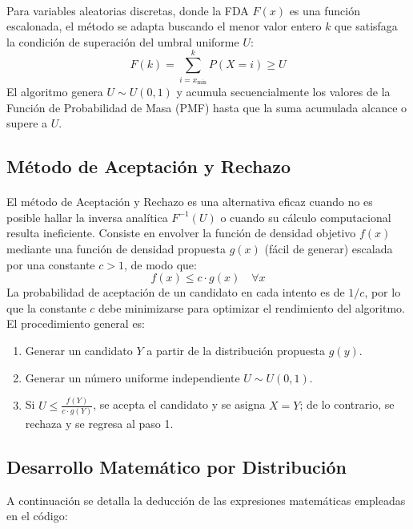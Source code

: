 \documentclass{article}
\begin{document}
\paragraph{}
Para variables aleatorias discretas, donde la FDA $F(x)$ es una función escalonada, el método se adapta buscando el menor valor entero $k$ que satisfaga la condición de superación del umbral uniforme $U$:
\begin{equation}
F(k) = \sum_{i=x_{\min}}^{k} P(X = i) \ge U
\end{equation}
El algoritmo genera $U \sim U(0,1)$ y acumula secuencialmente los valores de la Función de Probabilidad de Masa (PMF) hasta que la suma acumulada alcance o supere a $U$.

\subsection{Método de Aceptación y Rechazo}
\paragraph{}
El método de Aceptación y Rechazo es una alternativa eficaz cuando no es posible hallar la inversa analítica $F^{-1}(U)$ o cuando su cálculo computacional resulta ineficiente. Consiste en envolver la función de densidad objetivo $f(x)$ mediante una función de densidad propuesta $g(x)$ (fácil de generar) escalada por una constante $c > 1$, de modo que:
\begin{equation}
f(x) \le c \cdot g(x) \quad \forall x
\end{equation}
La probabilidad de aceptación de un candidato en cada intento es de $1/c$, por lo que la constante $c$ debe minimizarse para optimizar el rendimiento del algoritmo. El procedimiento general es:
\begin{enumerate}
    \item Generar un candidato $Y$ a partir de la distribución propuesta $g(y)$.
    \item Generar un número uniforme independiente $U \sim U(0,1)$.
    \item Si $U \le \frac{f(Y)}{c \cdot g(Y)}$, se acepta el candidato y se asigna $X = Y$; de lo contrario, se rechaza y se regresa al paso 1.
\end{enumerate}

\newpage
\subsection{Desarrollo Matemático por Distribución}
A continuación se detalla la deducción de las expresiones matemáticas empleadas en el código:
\end{document}
